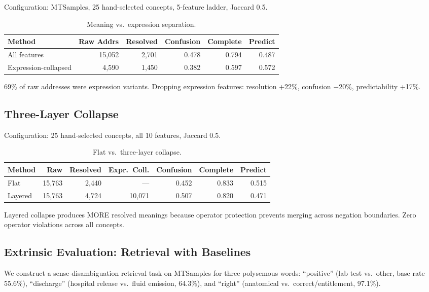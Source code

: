 \documentclass[11pt,a4paper]{article}
\begin{document}
Configuration: MTSamples, 25 hand-selected concepts, 5-feature ladder, Jaccard 0.5.

\begin{table}[h]
\centering
\small
\begin{tabular}{lrrrrr}
\toprule
Method & Raw Addrs & Resolved & Confusion & Complete & Predict \\
\midrule
All features & 15,052 & 2,701 & 0.478 & 0.794 & 0.487 \\
Expression-collapsed & 4,590 & 1,450 & 0.382 & 0.597 & 0.572 \\
\bottomrule
\end{tabular}
\caption{Meaning vs.\ expression separation.}
\end{table}

69\% of raw addresses were expression variants. Dropping expression features: resolution +22\%, confusion $-$20\%, predictability +17\%.

\subsection{Three-Layer Collapse}

Configuration: 25 hand-selected concepts, all 10 features, Jaccard 0.5.

\begin{table}[h]
\centering
\small
\begin{tabular}{lrrrrrr}
\toprule
Method & Raw & Resolved & Expr.\ Coll. & Confusion & Complete & Predict \\
\midrule
Flat & 15,763 & 2,440 & --- & 0.452 & 0.833 & 0.515 \\
Layered & 15,763 & 4,724 & 10,071 & 0.507 & 0.820 & 0.471 \\
\bottomrule
\end{tabular}
\caption{Flat vs.\ three-layer collapse.}
\end{table}

Layered collapse produces MORE resolved meanings because operator protection prevents merging across negation boundaries. Zero operator violations across all concepts.

\subsection{Extrinsic Evaluation: Retrieval with Baselines}
\label{sec:retrieval}

We construct a sense-disambiguation retrieval task on MTSamples for three polysemous words: ``positive'' (lab test vs.\ other, base rate 55.6\%), ``discharge'' (hospital release vs.\ fluid emission, 64.3\%), and ``right'' (anatomical vs.\ correct/entitlement, 97.1\%).
\end{document}

